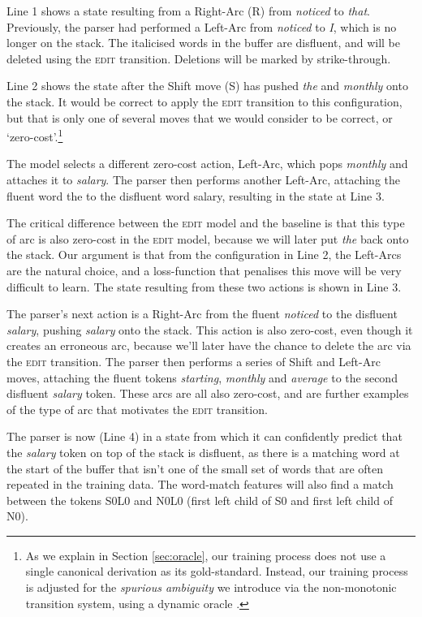 \documentclass[11pt,letterpaper]{article}
\newcommand{\edittrans}{\textsc{edit}\xspace}
\begin{document}
Line 1 shows a state resulting from a Right-Arc (R) from \emph{noticed}
to \emph{that}. Previously, the parser had performed a Left-Arc from \emph{noticed}
to \emph{I}, which is no
longer on the stack. The italicised words in the buffer are disfluent, and will
be deleted using the \edittrans transition. Deletions will be marked by strike-through.

Line 2 shows the state after the Shift move (S)
has pushed \emph{the} and \emph{monthly} onto the stack. It would be correct to
apply the \edittrans transition to this configuration, but that is only one of
several moves that we would consider to be correct, or `zero-cost'.\footnote{As
we explain in Section \ref{sec:oracle}, our training process does not use a single
canonical derivation as its gold-standard.  Instead, our training process is adjusted
for the \emph{spurious ambiguity} we introduce via the non-monotonic transition
system, using a dynamic oracle \citep{goldberg:12}.}

The model selects a different zero-cost action, Left-Arc, which pops \emph{monthly}
and attaches it to \emph{salary}. The parser then performs another Left-Arc,
attaching the fluent word the to the disfluent word salary, resulting in the
state at Line 3.

The critical difference between the \edittrans model and the baseline is that
this type of arc is also zero-cost in the \edittrans model, because we will later
put \emph{the} back onto the stack. Our argument is that from the configuration
in Line 2, the Left-Arcs are the natural choice, and a loss-function that penalises
this move will be very difficult to learn. The state resulting from these two
actions is shown in Line 3.

The parser’s next action is a Right-Arc from the fluent \emph{noticed} to the
disfluent \emph{salary}, pushing \emph{salary} onto the stack. This action is also
zero-cost, even though it creates an erroneous arc, because we’ll later have the chance to
delete the arc via the \edittrans transition. The parser then performs a series of
Shift and Left-Arc moves, attaching the fluent tokens \emph{starting}, \emph{monthly}
and \emph{average} to the second disfluent \emph{salary} token. These arcs are all
also zero-cost, and are further examples of the type of arc that motivates the
\edittrans transition.

The parser is now (Line 4) in a state from which it can confidently predict that
the \emph{salary} token on top of the stack is disfluent, as there is a matching
word at the start of the buffer that isn’t one of the small set of words that are
often repeated in the training data. The word-match features will also find a match
between the tokens S0L0 and N0L0 (first left child of S0 and first left child
of N0).
\end{document}
